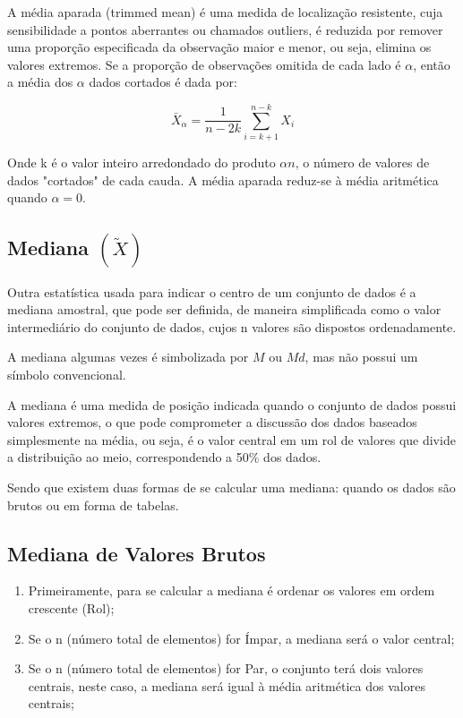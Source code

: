 A média aparada (trimmed mean) é uma medida de localização resistente, cuja sensibilidade a pontos aberrantes ou chamados outliers, é reduzida por remover uma proporção especificada da observação maior e menor, ou seja, elimina os valores extremos. Se a proporção de observações omitida de cada lado é $\alpha$, então a média dos $\alpha$ dados cortados é dada por:

\begin{equation}\label{aparada}
    \bar{X}_{\alpha}=\frac{1}{n-2k}\sum_{i=k+1}^{n-k}X_{i}
\end{equation}

Onde k é o valor inteiro arredondado do produto $\alpha n$, o número de valores de dados "cortados" de cada cauda. A média aparada reduz-se à média aritmética quando $\alpha = 0$.


\subsection{Mediana $(\widetilde{X})$}


\inic Outra estatística usada para indicar o centro de um conjunto de dados é a mediana amostral, que pode ser definida, de maneira simplificada como o valor intermediário do conjunto de dados, cujos n valores são dispostos ordenadamente.\vskip0.3cm


A mediana algumas vezes é simbolizada por $M$ ou $Md$, mas não possui um símbolo convencional.\vskip0.3cm



A mediana é uma medida de posição indicada quando o conjunto de dados possui valores extremos,
o que pode comprometer a discussão dos dados baseados simplesmente na média, ou seja, é o
valor central em um rol de valores que divide a distribuição ao meio, correspondendo a 50\% dos dados.\vskip0.3cm

Sendo que existem duas formas de se calcular uma mediana: quando os dados são brutos ou em forma de tabelas.\vskip0.3cm


\subsection{Mediana de Valores Brutos}


\begin{enumerate}
  \item Primeiramente, para se calcular a mediana é ordenar os valores em ordem crescente (Rol);
  \item Se o n (número total de elementos) for Ímpar, a mediana será o valor central;
  \item Se o n (número total de elementos) for Par, o conjunto terá dois valores centrais, neste caso, a mediana será igual à média aritmética dos valores centrais;
\end{enumerate}


